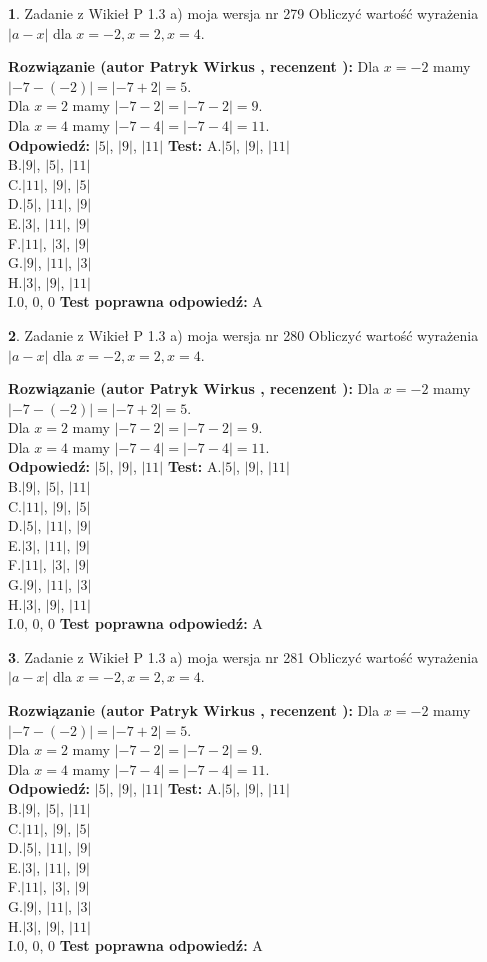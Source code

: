 \documentclass[12pt, a4paper]{article}
\theoremstyle{definition} %
\newtheorem{zad}{}
\newcommand{\zadStart}[1]{\begin{zad}#1\newline}
\newcommand{\zadStop}{\end{zad}}
\newcommand{\rozwStart}[2]{\noindent \textbf{Rozwiązanie (autor #1 , recenzent #2): }\newline}
\newcommand{\rozwStop}{\newline}
\newcommand{\odpStart}{\noindent \textbf{Odpowiedź:}\newline}
\newcommand{\odpStop}{\newline}
\newcommand{\testStart}{\noindent \textbf{Test:}\newline}
\newcommand{\testStop}{\newline}
\newcommand{\kluczStart}{\noindent \textbf{Test poprawna odpowiedź:}\newline}
\newcommand{\kluczStop}{\newline}
\begin{document}
\zadStart{Zadanie z Wikieł P 1.3 a) moja wersja nr 279}
Obliczyć wartość wyrażenia $|a - x|$ dla $x=-2,x=2,x=4$.
\zadStop
\rozwStart{Patryk Wirkus}{}
Dla $x = -2$ mamy $|-7 - (-2)| = |-7 + 2| = 5$.\\
Dla $x = 2$ mamy $|-7 - 2| = |-7 - 2| = 9$.\\
Dla $x = 4$ mamy $|-7 - 4| = |-7 - 4| = 11$.\\
\rozwStop
\odpStart
$|5|$, $|9|$, $|11|$
\odpStop
\testStart
A.$|5|$, $|9|$, $|11|$\\
B.$|9|$, $|5|$, $|11|$\\
C.$|11|$, $|9|$, $|5|$\\
D.$|5|$, $|11|$, $|9|$\\
E.$|3|$, $|11|$, $|9|$\\
F.$|11|$, $|3|$, $|9|$\\
G.$|9|$, $|11|$, $|3|$\\
H.$|3|$, $|9|$, $|11|$\\
I.$0$, $0$, $0$
\testStop
\kluczStart
A
\kluczStop



\zadStart{Zadanie z Wikieł P 1.3 a) moja wersja nr 280}
Obliczyć wartość wyrażenia $|a - x|$ dla $x=-2,x=2,x=4$.
\zadStop
\rozwStart{Patryk Wirkus}{}
Dla $x = -2$ mamy $|-7 - (-2)| = |-7 + 2| = 5$.\\
Dla $x = 2$ mamy $|-7 - 2| = |-7 - 2| = 9$.\\
Dla $x = 4$ mamy $|-7 - 4| = |-7 - 4| = 11$.\\
\rozwStop
\odpStart
$|5|$, $|9|$, $|11|$
\odpStop
\testStart
A.$|5|$, $|9|$, $|11|$\\
B.$|9|$, $|5|$, $|11|$\\
C.$|11|$, $|9|$, $|5|$\\
D.$|5|$, $|11|$, $|9|$\\
E.$|3|$, $|11|$, $|9|$\\
F.$|11|$, $|3|$, $|9|$\\
G.$|9|$, $|11|$, $|3|$\\
H.$|3|$, $|9|$, $|11|$\\
I.$0$, $0$, $0$
\testStop
\kluczStart
A
\kluczStop



\zadStart{Zadanie z Wikieł P 1.3 a) moja wersja nr 281}
Obliczyć wartość wyrażenia $|a - x|$ dla $x=-2,x=2,x=4$.
\zadStop
\rozwStart{Patryk Wirkus}{}
Dla $x = -2$ mamy $|-7 - (-2)| = |-7 + 2| = 5$.\\
Dla $x = 2$ mamy $|-7 - 2| = |-7 - 2| = 9$.\\
Dla $x = 4$ mamy $|-7 - 4| = |-7 - 4| = 11$.\\
\rozwStop
\odpStart
$|5|$, $|9|$, $|11|$
\odpStop
\testStart
A.$|5|$, $|9|$, $|11|$\\
B.$|9|$, $|5|$, $|11|$\\
C.$|11|$, $|9|$, $|5|$\\
D.$|5|$, $|11|$, $|9|$\\
E.$|3|$, $|11|$, $|9|$\\
F.$|11|$, $|3|$, $|9|$\\
G.$|9|$, $|11|$, $|3|$\\
H.$|3|$, $|9|$, $|11|$\\
I.$0$, $0$, $0$
\testStop
\kluczStart
A
\kluczStop
\end{document}
